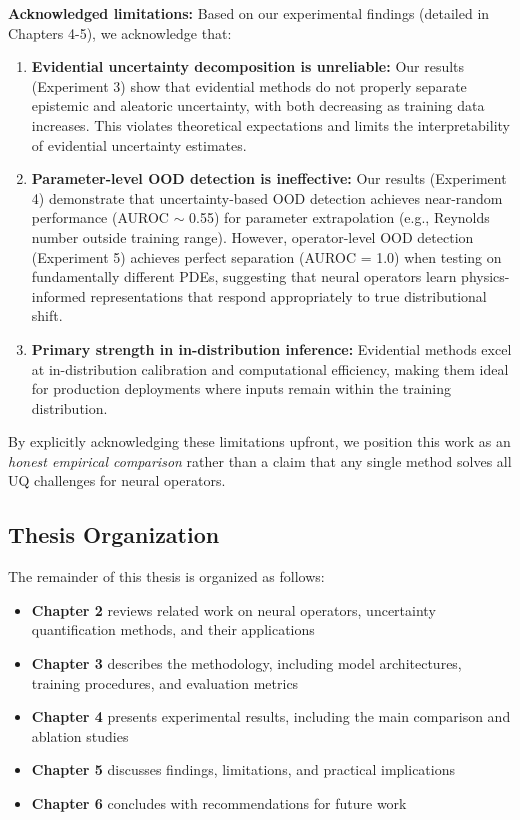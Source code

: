 \textbf{Acknowledged limitations:}
Based on our experimental findings (detailed in Chapters 4-5), we acknowledge that:
\begin{enumerate}
    \item \textbf{Evidential uncertainty decomposition is unreliable:} Our results (Experiment 3) show that evidential methods do not properly separate epistemic and aleatoric uncertainty, with both decreasing as training data increases. This violates theoretical expectations and limits the interpretability of evidential uncertainty estimates.

    \item \textbf{Parameter-level OOD detection is ineffective:} Our results (Experiment 4) demonstrate that uncertainty-based OOD detection achieves near-random performance (AUROC $\sim$ 0.55) for parameter extrapolation (e.g., Reynolds number outside training range). However, operator-level OOD detection (Experiment 5) achieves perfect separation (AUROC = 1.0) when testing on fundamentally different PDEs, suggesting that neural operators learn physics-informed representations that respond appropriately to true distributional shift.

    \item \textbf{Primary strength in in-distribution inference:} Evidential methods excel at in-distribution calibration and computational efficiency, making them ideal for production deployments where inputs remain within the training distribution.
\end{enumerate}

By explicitly acknowledging these limitations upfront, we position this work as an \emph{honest empirical comparison} rather than a claim that any single method solves all UQ challenges for neural operators.

\subsection{Thesis Organization}

The remainder of this thesis is organized as follows:
\begin{itemize}
    \item \textbf{Chapter 2} reviews related work on neural operators, uncertainty quantification methods, and their applications
    \item \textbf{Chapter 3} describes the methodology, including model architectures, training procedures, and evaluation metrics
    \item \textbf{Chapter 4} presents experimental results, including the main comparison and ablation studies
    \item \textbf{Chapter 5} discusses findings, limitations, and practical implications
    \item \textbf{Chapter 6} concludes with recommendations for future work
\end{itemize}


